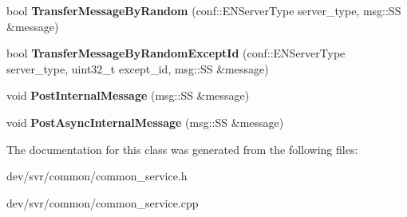 \begin{DoxyCompactItemize}
\item 
\hypertarget{classConnectServerMsgTransferService_a559f1db502eaf8c2dab6b65b56e4bf39}{
bool {\bfseries TransferMessageByRandom} (conf::ENServerType server\_\-type, msg::SS \&message)}
\label{classConnectServerMsgTransferService_a559f1db502eaf8c2dab6b65b56e4bf39}

\item 
\hypertarget{classConnectServerMsgTransferService_a96d14f27eb62e266fd7f0c268e040fa7}{
bool {\bfseries TransferMessageByRandomExceptId} (conf::ENServerType server\_\-type, uint32\_\-t except\_\-id, msg::SS \&message)}
\label{classConnectServerMsgTransferService_a96d14f27eb62e266fd7f0c268e040fa7}

\item 
\hypertarget{classConnectServerMsgTransferService_a3a370cce49e477b7cf6f5e2a4fa86a64}{
void {\bfseries PostInternalMessage} (msg::SS \&message)}
\label{classConnectServerMsgTransferService_a3a370cce49e477b7cf6f5e2a4fa86a64}

\item 
\hypertarget{classConnectServerMsgTransferService_a8693f78e83f99b3320565481cbf108eb}{
void {\bfseries PostAsyncInternalMessage} (msg::SS \&message)}
\label{classConnectServerMsgTransferService_a8693f78e83f99b3320565481cbf108eb}

\end{DoxyCompactItemize}


The documentation for this class was generated from the following files:\begin{DoxyCompactItemize}
\item 
dev/svr/common/common\_\-service.h\item 
dev/svr/common/common\_\-service.cpp\end{DoxyCompactItemize}
